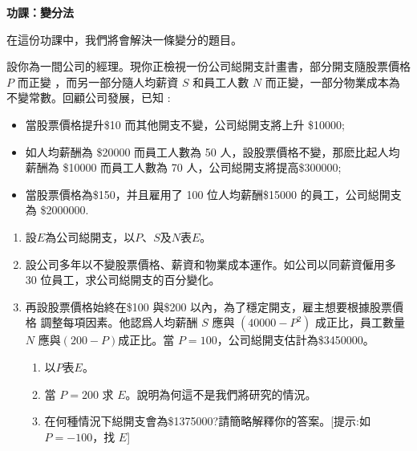 \documentclass[12pt]{article}
\begin{document}
    \newpage

    \begin{center}
        \textbf{功課：變分法}
    \end{center}

    在這份功課中，我們將會解決一條變分的題目。

    設你為一間公司的經理。現你正檢視一份公司縂開支計畫書，部分開支隨股票價格 $P$ 而正變 ，而另一部分隨人均薪資 $S$ 和員工人數 $N$ 而正變，一部分物業成本為不變常數。回顧公司發展，已知 :\begin{itemize}
        \item 當股票價格提升\$10 而其他開支不變，公司縂開支將上升 \$10000;
        \item 如人均薪酬為 \$20000 而員工人數為 50 人，設股票價格不變，那麽比起人均薪酬為 \$10000 而員工人數為 70 人，公司縂開支將提高\$300000;
        \item 當股票價格為\$150，并且雇用了 100 位人均薪酬\$15000 的員工，公司縂開支為 \$2000000.
    \end{itemize}

    \begin{enumerate}
        \item 設$E$為公司縂開支，以$P$、$S$及$N$表$E$。
        \item 設公司多年以不變股票價格、薪資和物業成本運作。如公司以同薪資僱用多 30 位員工，求公司縂開支的百分變化。
        \item 再設股票價格始終在\$100 與\$200 以內，為了穩定開支，雇主想要根據股票價格 調整每項因素。他認爲人均薪酬 $S$ 應與 $(40000-P^2 )$ 成正比，員工數量 $N$ 應與$(200-P)$成正比。當 $P=100$，公司縂開支估計為\$3450000。\begin{enumerate}
            \item 以$P$表$E$。
            \item 當 $P=200$ 求 $E$。說明為何這不是我們將研究的情況。
            \item 在何種情況下縂開支會為\$1375000?請簡略解釋你的答案。[提示:如$P=-100$，找 $E$]
        \end{enumerate}
    \end{enumerate}
\end{document}
